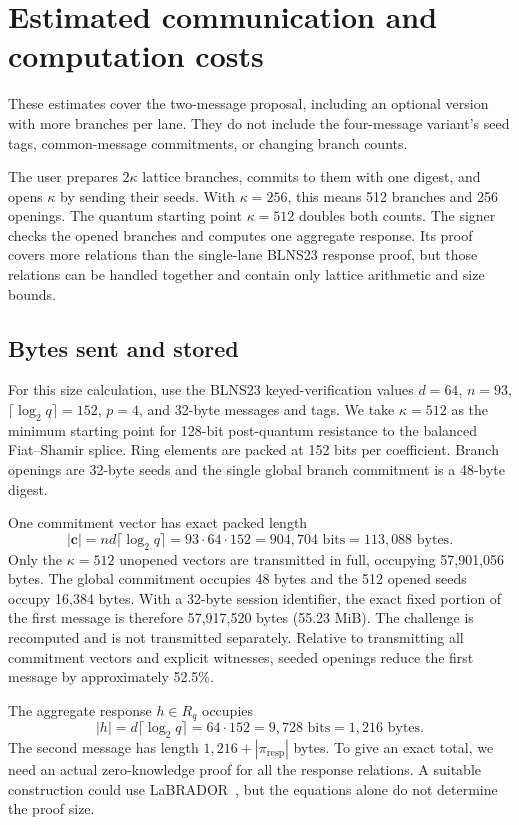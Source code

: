 \documentclass[10pt]{article}
\begin{document}
\section{Estimated communication and computation costs}\label{sec:efficiency}

These estimates cover the two-message proposal, including an optional version
with more branches per lane.  They do not include the four-message variant's
seed tags, common-message commitments, or changing branch counts.

The user prepares $2\kappa$ lattice branches, commits to them with one
digest, and opens $\kappa$ by sending their seeds.  With $\kappa=256$, this
means 512 branches and 256 openings.  The quantum starting point
$\kappa=512$ doubles both counts.  The signer checks the opened branches and
computes one aggregate response.  Its proof covers more relations than the
single-lane BLNS23 response proof, but those relations can be handled together
and contain only lattice arithmetic and size bounds.

\subsection{Bytes sent and stored}

For this size calculation, use the BLNS23 keyed-verification values
$d=64$, $n=93$, $\lceil\log_2q\rceil=152$, $p=4$, and 32-byte messages and
tags.  We take $\kappa=512$ as the minimum starting point for 128-bit
post-quantum resistance to the balanced Fiat--Shamir splice.  Ring elements are packed at
152 bits per coefficient.  Branch openings are 32-byte seeds and the single
global branch commitment is a 48-byte digest.

One commitment vector has exact packed length
\[
 |\mathbf c|=nd\lceil\log_2q\rceil
 =93\cdot64\cdot152=904{,}704\text{ bits}=113{,}088\text{ bytes}.
\]
Only the $\kappa=512$ unopened vectors are transmitted in full, occupying
57,901,056 bytes.  The global commitment occupies 48 bytes and the 512 opened
seeds occupy 16,384 bytes.  With a 32-byte session identifier, the exact fixed
portion of the first message is therefore 57,917,520 bytes (55.23 MiB).
The challenge is recomputed and is not transmitted separately.  Relative to
transmitting all commitment vectors and explicit witnesses, seeded openings
reduce the first message by approximately 52.5\%.

The aggregate response $h\in R_q$ occupies
\[
 |h|=d\lceil\log_2q\rceil=64\cdot152=9{,}728\text{ bits}
 =1{,}216\text{ bytes}.
\]
The second message has length $1{,}216+|\pi_{\mathrm{resp}}|$ bytes.  To give an exact
total, we need an actual zero-knowledge proof for all the response relations.
A suitable construction could use LaBRADOR~\cite{BS22}, but the equations
alone do not determine the proof size.
\end{document}
